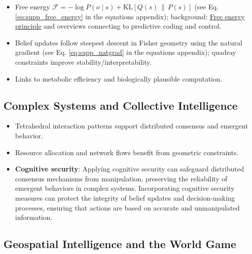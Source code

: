 \documentclass[
  10pt,
]{article}
\providecommand{\tightlist}{%
  \setlength{\itemsep}{0pt}\setlength{\parskip}{0pt}}
\begin{document}
\begin{itemize}
\tightlist
\item
  Free energy
  \(\mathcal{F} = -\log P(o\mid s) + \mathrm{KL}[Q(s)\,\|\,P(s)]\) (see
  Eq. \eqref{eq:supp_free_energy} in the equations appendix);
  background:
  \href{https://en.wikipedia.org/wiki/Free_energy_principle}{Free energy
  principle} and overviews connecting to predictive coding and control.
\item
  Belief updates follow steepest descent in Fisher geometry using the
  natural gradient (see Eq. \eqref{eq:supp_natgrad} in the equations
  appendix); quadray constraints improve stability/interpretability.
\item
  Links to metabolic efficiency and biologically plausible computation.
\end{itemize}

\hypertarget{complex-systems-and-collective-intelligence}{%
\subsection{Complex Systems and Collective
Intelligence}\label{complex-systems-and-collective-intelligence}}

\begin{itemize}
\tightlist
\item
  Tetrahedral interaction patterns support distributed consensus and
  emergent behavior.
\item
  Resource allocation and network flows benefit from geometric
  constraints.
\item
  \textbf{Cognitive security}: Applying cognitive security can safeguard
  distributed consensus mechanisms from manipulation, preserving the
  reliability of emergent behaviors in complex systems. Incorporating
  cognitive security measures can protect the integrity of belief
  updates and decision-making processes, ensuring that actions are based
  on accurate and unmanipulated information.
\end{itemize}

\hypertarget{geospatial-intelligence-and-the-world-game}{%
\subsection{Geospatial Intelligence and the World
Game}\label{geospatial-intelligence-and-the-world-game}}
\end{document}

